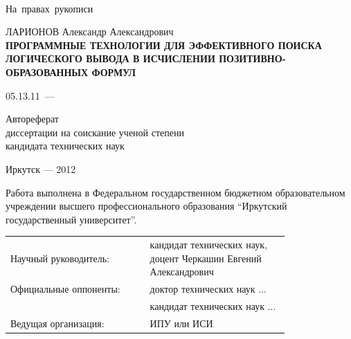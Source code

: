 \documentclass[a4paper]{report}
\begin{document}
\begin{titlepage}
\mbox{~}\\{}
\vfill{}
\hfill{\vbox{\hbox{На правах рукописи}}}
\vspace{1cm}\vfill
\begin{center}
    ЛАРИОНОВ Александр Александрович \\
    \vspace{0.5cm}
\bf ПРОГРАММНЫЕ ТЕХНОЛОГИИ ДЛЯ ЭФФЕКТИВНОГО ПОИСКА ЛОГИЧЕСКОГО ВЫВОДА В ИСЧИСЛЕНИИ ПОЗИТИВНО-ОБРАЗОВАННЫХ ФОРМУЛ
\end{center}
\vfill
\hfil\hbox{\hbox{05.13.11 --- }
    \hbox{}%
}\hfil
\vspace{1cm}
\begin{center}
    Автореферат \\
    диссертации на соискание ученой степени \\
    кандидата технических наук
\end{center}
\vfill
\vfill
\begin{center}
{Иркутск --- 2012}
\end{center}
\end{titlepage}

%
\def\namepc{\hbox{$\rm\mu{}$PrISM}}

\newpage

Работа выполнена в Федеральном государственном бюджетном образовательном учреждении высшего профессионального образования ``Иркутский государственный университет''.


\begin{longtable}[H]{p{0.4\linewidth}p{0.4\linewidth}}
Научный руководитель: & кандидат технических наук, доцент Черкашин Евгений Александрович \\
Официальные  оппоненты: & доктор технических наук ... \\
{}~{}  & кандидат технических наук ... \\
Ведущая организация: & ИПУ или ИСИ \\
\end{longtable}
\end{document}
